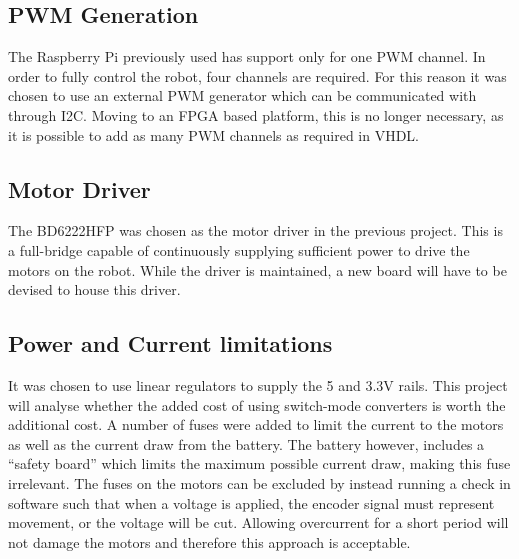 \subsection{PWM Generation} %
\label{sub:pwm_generation}
The Raspberry Pi previously used has support only for one PWM channel.
In order to fully control the robot, four channels are required.
For this reason it was chosen to use an external PWM generator which can be communicated with through I2C.
Moving to an FPGA based platform, this is no longer necessary, as it is possible to add as many PWM channels as required in VHDL\@.

\subsection{Motor Driver} %
\label{sub:motor_driver}
The BD6222HFP was chosen as the motor driver in the previous project.
This is a full-bridge capable of continuously supplying sufficient power to drive the motors on the robot.
While the driver is maintained, a new board will have to be devised to house this driver.

\subsection{Power and Current limitations} %
\label{sub:power_and_current_limitations}
It was chosen to use linear regulators to supply the 5 and 3.3V rails.
This project will analyse whether the added cost of using switch-mode converters is worth the additional cost.
A number of fuses were added to limit the current to the motors as well as the current draw from the battery.
The battery however, includes a ``safety board'' which limits the maximum possible current draw, making this fuse irrelevant.
The fuses on the motors can be excluded by instead running a check in software such that when a voltage is applied, the encoder signal must represent movement, or the voltage will be cut.
Allowing overcurrent for a short period will not damage the motors and therefore this approach is acceptable.

